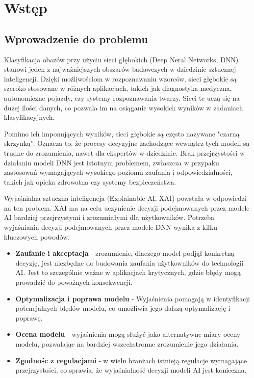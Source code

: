 
\chapter*{Wstęp}

\section*{Wprowadzenie do problemu}
Klasyfikacja obazów przy użyciu sieci głębokich (Deep Neral Networks, DNN) stanowi jeden z najważniejszych obszarów badawczych w dziedzinie sztucznej inteligencji.
Dzięki możliwościom w rozpoznawaniu wzorców, sieci głębokie są szeroko stosowane w różnych aplikacjach, takich jak diagnostyka medyczna, autonomiczne pojazdy, czy systemy rozpoznawania twarzy.
Sieci te uczą się na dużej ilości danych, co pozwala im na osiąganie wysokich wyników w zadaniach klasyfikacyjnych.

Pomimo ich imponujących wyników, sieci głębokie są często nazywane "czarną skrzynką".
Oznacza to, że procesy decyzyjne zachodzące wewnątrz tych modeli są trudne do zrozumienia, nawet dla ekspertów w dziedzinie.
Brak przejrzystości w działaniu modeli DNN jest istotnym problemem, zwłaszcza w przypaku zastosowań wymagających wysokiego poziomu zaufania i odpowiedzialności, takich jak opieka zdrowotna czy systemy bezpieczeństwa.

Wyjaśnialna sztuczna inteligencja (Explainable AI, XAI) powstała w odpowiedzi na ten problem.
XAI ma na celu uczynienie decyzji podejmowanych przez modele AI bardziej przejrzystymi i zrozumiałymi dla użytkowników.
Potrzeba wyjaśniania decyzji podejmowanych przez modele DNN wynika z kilku kluczowych powodów:
\begin{itemize}
	\item \textbf{Zaufanie i akceptacja} - zrozumienie, dlaczego model podjął konkretną decyzję, jest niezbędne do budowania zaufania użytkowników do technologii AI.
	      Jest to szczególnie ważne w aplikacjach krytycznych, gdzie błędy mogą prowadzić do poważnych konsekwencji.
	\item \textbf{Optymalizacja i poprawa modelu} - Wyjaśnienia pomagają w identyfikacji potencjalnych błędów modelu, co umożliwia jego dalszą optymalizację i poprawę.
	\item \textbf{Ocena modelu} - wyjaśnienia mogą służyć jako alternatywne miary oceny modelu, pozwalając na bardziej wszechstronne zrozumienie jego działania.
	\item \textbf{Zgodnośc z regulacjami} - w wielu branżach istnieją regulacje wymagające przejrzystości, co sprawia, że wyjaśnialność decyzji modeli AI jest konieczna.
\end{itemize}

